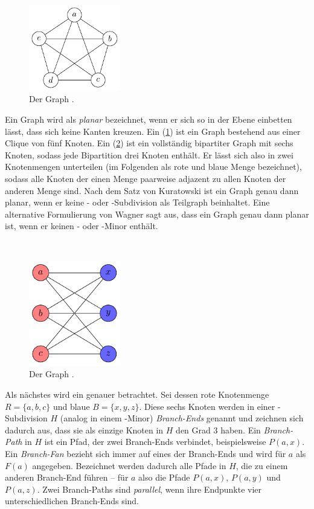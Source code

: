 \begin{figure}
  \includegraphics[width=4cm]{bilder/K_5.pdf}
  \caption{Der Graph \kf.}
  \label{fig:K5}
\end{figure}
Ein Graph wird als \emph{planar} bezeichnet, wenn er sich so in der Ebene einbetten lässt, dass sich keine Kanten kreuzen.
Ein \kf (\sAbb \ref{fig:K5}) ist ein Graph bestehend aus einer Clique von fünf Knoten.
Ein \kdd (\sAbb \ref{fig:K33}) ist ein vollständig bipartiter Graph mit sechs Knoten, sodass jede Bipartition drei Knoten enthält.
Er lässt sich also in zwei Knotenmengen unterteilen (im Folgenden als rote und blaue Menge bezeichnet), sodass alle Knoten der einen Menge paarweise adjazent zu allen Knoten der anderen Menge sind.
Nach dem Satz von Kuratowski \cite{Kur30} ist ein Graph genau dann planar, wenn er keine \kf- oder \kdd-Subdivision als Teilgraph beinhaltet.
Eine alternative Formulierung von Wagner \cite{Wag37} sagt aus, dass ein Graph genau dann planar ist, wenn er keinen \kf- oder \kdd-Minor enthält\cite{Die12}.

\ \\
\begin{figure}
  \includegraphics[width=4cm]{bilder/K_33.pdf}
  \caption{Der Graph \kdd.}
  \label{fig:K33}
\end{figure}
Als nächstes wird ein \kdd genauer betrachtet.
Sei dessen rote Knotenmenge $R = \{a, b, c\}$ und blaue $B = \{x, y, z\}$.
Diese sechs Knoten werden in einer \kdd-Subdivision $H$ (analog in einem \kdd-Minor) \emph{Branch-Ends} genannt und zeichnen sich dadurch aus, dass sie als einzige Knoten in $H$ den Grad 3 haben.
Ein \emph{Branch-Path} in $H$ ist ein Pfad, der zwei Branch-Ends verbindet, beispielsweise $P(a, x)$.
Ein \emph{Branch-Fan} bezieht sich immer auf eines der Branch-Ends und wird \zB für $a$ als $F(a)$ angegeben.
Bezeichnet werden dadurch alle Pfade in $H$, die zu einem anderen Branch-End führen -- für $a$ also die Pfade $P(a, x)$, $P(a, y)$ und $P(a, z)$.
Zwei Branch-Paths sind \emph{parallel}, wenn ihre Endpunkte vier unterschiedlichen Branch-Ends sind.


